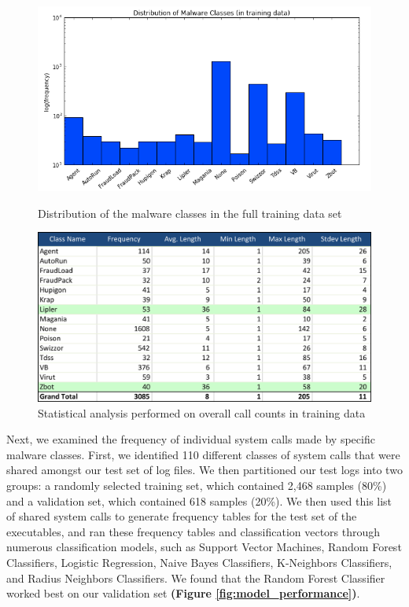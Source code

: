 \documentclass[11pt]{article}
\begin{document}
\begin{figure}[t]
\centering
\includegraphics[width=12cm]{malware_distribution}
\caption{Distribution of the malware classes in the full training data set}
\label{fig:malware_distribution}
\vspace{1cm}
\includegraphics[width=12cm]{length_analysis}
\caption{Statistical analysis performed on overall call counts in training data}
\label{fig:length_analysis}
\end{figure}

Next, we examined the frequency of individual system calls made by specific malware classes. First, we identified 110 different classes of system calls that were shared amongst our test set of log files. We then partitioned our test logs into two groups: a randomly selected training set, which contained 2,468 samples (80\%) and a validation set, which contained 618 samples (20\%). We then used this list of shared system calls to generate frequency tables for the test set of the executables, and ran these frequency tables and classification vectors through numerous classification models, such as Support Vector Machines, Random Forest Classifiers, Logistic Regression, Naive Bayes Classifiers, K-Neighbors Classifiers, and Radius Neighbors Classifiers. We found that the Random Forest Classifier worked best on our validation set \textbf{(Figure \ref{fig:model_performance})}.\\
\end{document}
